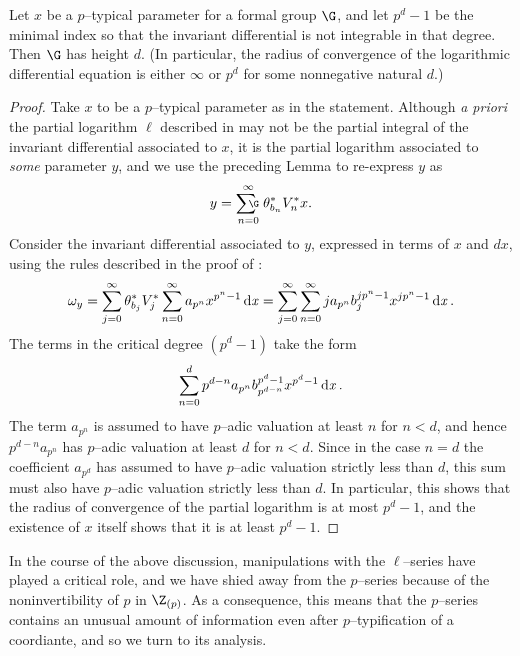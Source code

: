\begin{corollary}\label{FGLHeightIsAnInteger}
Let \(x\) be a \(p\)--typical parameter for a formal group \(\G\), and let \(p^d-1\) be the minimal index so that the invariant differential is not integrable in that degree.  Then \(\G\) has height \(d\).  (In particular, the radius of convergence of the logarithmic differential equation is either \(\infty\) or \(p^d\) for some nonnegative natural \(d\).)
\end{corollary}
\begin{proof}
Take \(x\) to be a \(p\)--typical parameter as in the statement.  Although \textit{a priori} the partial logarithm \(\ell\) described in  may not be the partial integral of the invariant differential associated to \(x\), it is the partial logarithm associated to \emph{some} parameter \(y\), and we use the preceding Lemma to re-express \(y\) as \[y = \sumfgl{\G}_{n=0}^\infty \theta_{b_n}^* V_n^* x.\]  Consider the invariant differential associated to \(y\), expressed in terms of \(x\) and \(dx\), using the rules described in the proof of : \[\omega_y = \sum_{j=0}^\infty \theta_{b_j}^* V_j^* \sum_{n=0}^\infty a_{p^n} x^{p^n-1} \operatorname{d\mathit{x}} = \sum_{j=0}^\infty \sum_{n=0}^\infty j a_{p^n} b_j^{jp^n-1} x^{jp^n-1} \operatorname{d\mathit{x}}.\]  The terms in the critical degree \((p^d-1)\) take the form \[\sum_{n=0}^d p^{d-n} a_{p^n} b_{p^{d-n}}^{p^d-1} x^{p^d-1} \operatorname{d\mathit{x}}.\]  The term \(a_{p^n}\) is assumed to have \(p\)--adic valuation at least \(n\) for \(n < d\), and hence \(p^{d-n}a_{p^n}\) has \(p\)--adic valuation at least \(d\) for \(n < d\).  Since in the case \(n = d\) the coefficient \(a_{p^d}\) has assumed to have \(p\)--adic valuation strictly less than \(d\), this sum must also have \(p\)--adic valuation strictly less than \(d\).  In particular, this shows that the radius of convergence of the partial logarithm is at most \(p^d-1\), and the existence of \(x\) itself shows that it is at least \(p^d-1\).
\end{proof}

In the course of the above discussion, manipulations with the \(\ell\)--series have played a critical role, and we have shied away from the \(p\)--series because of the noninvertibility of \(p\) in \(\Z_{(p)}\).  As a consequence, this means that the \(p\)--series contains an unusual amount of information even after \(p\)--typification of a coordiante, and so we turn to its analysis.

